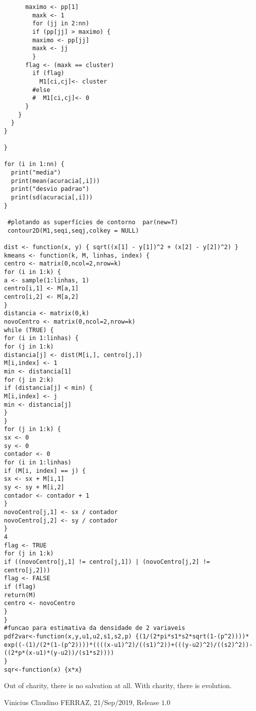 \documentclass[12pt]{article}
\begin{document}
\begin{verbatim}
 	  maximo <- pp[1]
        maxk <- 1
        for (jj in 2:nn)
	    if (pp[jj] > maximo) {
		maximo <- pp[jj]
		maxk <- jj
	    }
   	  flag <- (maxk == cluster)
        if (flag)
          M1[ci,cj]<- cluster
        #else
        #  M1[ci,cj]<- 0
      }
    }
  }
}

}

for (i in 1:nn) {
  print("media")
  print(mean(acuracia[,i]))
  print("desvio padrao")
  print(sd(acuracia[,i]))
}

 #plotando as superfícies de contorno  par(new=T)
 contour2D(M1,seqi,seqj,colkey = NULL)

dist <- function(x, y) { sqrt((x[1] - y[1])^2 + (x[2] - y[2])^2) }
kmeans <- function(k, M, linhas, index) {
centro <- matrix(0,ncol=2,nrow=k)
for (i in 1:k) {
a <- sample(1:linhas, 1)
centro[i,1] <- M[a,1]
centro[i,2] <- M[a,2]
}
distancia <- matrix(0,k)
novoCentro <- matrix(0,ncol=2,nrow=k)
while (TRUE) {
for (i in 1:linhas) {
for (j in 1:k)
distancia[j] <- dist(M[i,], centro[j,])
M[i,index] <- 1
min <- distancia[1]
for (j in 2:k)
if (distancia[j] < min) {
M[i,index] <- j
min <- distancia[j]
}
}
for (j in 1:k) {
sx <- 0
sy <- 0
contador <- 0
for (i in 1:linhas)
if (M[i, index] == j) {
sx <- sx + M[i,1]
sy <- sy + M[i,2]
contador <- contador + 1
}
novoCentro[j,1] <- sx / contador
novoCentro[j,2] <- sy / contador
}
4
flag <- TRUE
for (j in 1:k)
if ((novoCentro[j,1] != centro[j,1]) | (novoCentro[j,2] != centro[j,2]))
flag <- FALSE
if (flag)
return(M)
centro <- novoCentro
}
}
#funcao para estimativa da densidade de 2 variaveis
pdf2var<-function(x,y,u1,u2,s1,s2,p) {(1/(2*pi*s1*s2*sqrt(1-(p^2))))*
exp((-(1)/(2*(1-(p^2))))*((((x-u1)^2)/((s1)^2))+(((y-u2)^2)/((s2)^2))-
((2*p*(x-u1)*(y-u2))/(s1*s2))))
}
sqr<-function(x) {x*x}
\end{verbatim}


\vspace{3mm}

Out of charity, there is no salvation at all. With charity, there is evolution.

\vspace{3mm}

Vinicius Claudino FERRAZ, 21/Sep/2019, Release $1.0$
\end{document}
